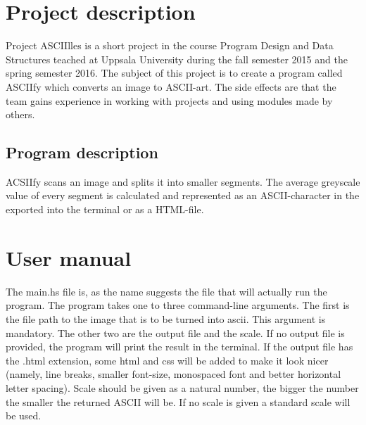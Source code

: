 \documentclass[12pt, a4paper]{article}
\begin{document}
\tableofcontents

\newpage


	\section{Project description}

		Project ASCIIlles is a short project in the course Program Design and Data Structures teached at Uppsala University during the fall semester 2015 and the spring semester 2016. The subject of this project is to create a program called ASCIIfy which converts an image to ASCII-art. The side effects are that the team gains experience in working with projects and using modules made by others.


		\subsection{Program description }

		ACSIIfy scans an image and splits it into smaller segments. The average greyscale value of every segment is calculated and represented as an ASCII-character in the exported into the terminal or as a HTML-file.


	\section{User manual}

	The main.hs file is, as the name suggests the file that will actually run the program. The program takes one to three command-line arguments. The first is the file path to the image that is to be turned into ascii. This argument is mandatory. The other two are the output file and the scale. If no output file is provided, the program will print the result in the terminal. If the output file has the .html extension, some html and css will be added to make it look nicer (namely, line breaks, smaller font-size, monospaced font and better horizontal letter spacing). Scale should be given as a natural number, the bigger the number the smaller the returned ASCII will be. If no scale is given a standard scale will be used.
\end{document}
